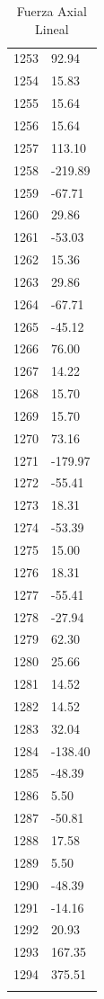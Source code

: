 \documentclass[a4paper,11pt]{article}
\begin{document}
\begin{center}
\begin{longtable}{|R{1.5cm}|R{2.5cm}|}
 1253 &        92.94 \\
 1254 &        15.83 \\
 1255 &        15.64 \\
 1256 &        15.64 \\
 1257 &       113.10 \\
 1258 &      -219.89 \\
 1259 &       -67.71 \\
 1260 &        29.86 \\
 1261 &       -53.03 \\
 1262 &        15.36 \\
 1263 &        29.86 \\
 1264 &       -67.71 \\
 1265 &       -45.12 \\
 1266 &        76.00 \\
 1267 &        14.22 \\
 1268 &        15.70 \\
 1269 &        15.70 \\
 1270 &        73.16 \\
 1271 &      -179.97 \\
 1272 &       -55.41 \\
 1273 &        18.31 \\
 1274 &       -53.39 \\
 1275 &        15.00 \\
 1276 &        18.31 \\
 1277 &       -55.41 \\
 1278 &       -27.94 \\
 1279 &        62.30 \\
 1280 &        25.66 \\
 1281 &        14.52 \\
 1282 &        14.52 \\
 1283 &        32.04 \\
 1284 &      -138.40 \\
 1285 &       -48.39 \\
 1286 &         5.50 \\
 1287 &       -50.81 \\
 1288 &        17.58 \\
 1289 &         5.50 \\
 1290 &       -48.39 \\
 1291 &       -14.16 \\
 1292 &        20.93 \\
 1293 &       167.35 \\
 1294 &       375.51 \\
\bottomrule[0.8mm]                               
\caption{Fuerza Axial Lineal}             
\end{longtable}                                  
\end{center}                                     
\end{document}

